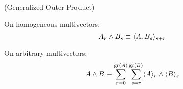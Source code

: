 \begin{corollary}
	(Generalized Outer Product)

	On homogeneous multivectors:
	\[A_r \wedge B_s \equiv \langle A_rB_s \rangle_{s+r}\]
	
	On arbitrary multivectors:
	\[A \wedge B \equiv \sum_{r=0}^{\mathrm{gr}\left(A\right)}\sum_{s=r}^{\mathrm{gr}\left(B\right)} \langle A \rangle_{r} \wedge \langle B \rangle_{s}\]
\end{corollary}

